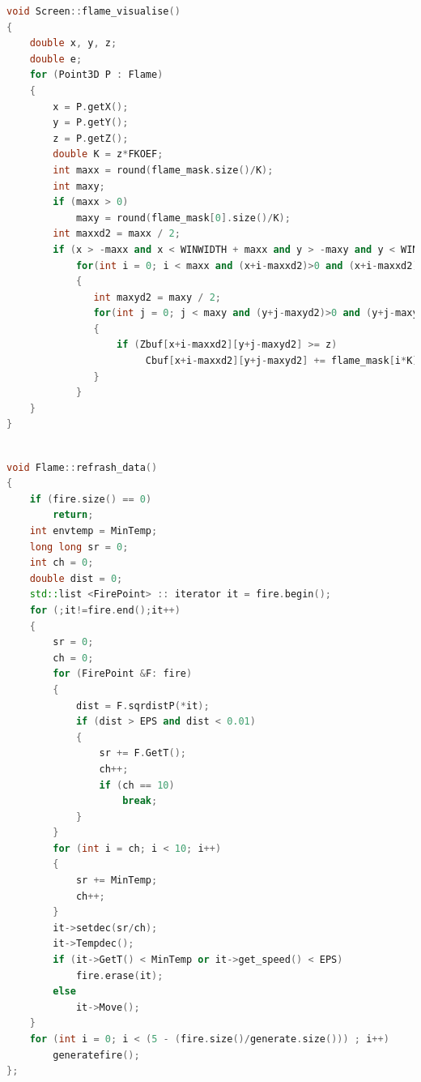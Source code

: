\documentclass[a4paper,14pt]{report}
\begin{document}
\newpage
\begin{center}
\captionsetup{justification=raggedright,singlelinecheck=off}
\begin{lstlisting}[language=C++,
                   directivestyle={\color{black}}
                   emph={int,char,double,float,unsigned},
                   emphstyle={\color{blue}},label=brute,caption = Функция визуализации огня]
void Screen::flame_visualise()
{
    double x, y, z;
    double e;
    for (Point3D P : Flame)
    {
        x = P.getX();
        y = P.getY();
        z = P.getZ();
        double K = z*FKOEF;
        int maxx = round(flame_mask.size()/K);
        int maxy;
        if (maxx > 0)
            maxy = round(flame_mask[0].size()/K);
        int maxxd2 = maxx / 2;
        if (x > -maxx and x < WINWIDTH + maxx and y > -maxy and y < WINHEIGHT + maxy and abs(z) > 0.5)
            for(int i = 0; i < maxx and (x+i-maxxd2)>0 and (x+i-maxxd2)<WINWIDTH; i++)
            {
               int maxyd2 = maxy / 2;
               for(int j = 0; j < maxy and (y+j-maxyd2)>0 and (y+j-maxyd2)<WINWIDTH; j++)
               {
                   if (Zbuf[x+i-maxxd2][y+j-maxyd2] >= z)
                        Cbuf[x+i-maxxd2][y+j-maxyd2] += flame_mask[i*K][j*K];
               }
            }
    }
}
\end{lstlisting}
\end{center}
\newpage
\begin{center}
\captionsetup{justification=raggedright,singlelinecheck=off}
\begin{lstlisting}[language=C++,
                   directivestyle={\color{black}}
                   emph={int,char,double,float,unsigned},
                   emphstyle={\color{blue}},label=brute,caption = Функция обновления данных частиц огня]

void Flame::refrash_data()
{
    if (fire.size() == 0)
        return;
    int envtemp = MinTemp;
    long long sr = 0;
    int ch = 0;
    double dist = 0;
    std::list <FirePoint> :: iterator it = fire.begin();
    for (;it!=fire.end();it++)
    {
        sr = 0;
        ch = 0;
        for (FirePoint &F: fire)
        {
            dist = F.sqrdistP(*it);
            if (dist > EPS and dist < 0.01)
            {
                sr += F.GetT();
                ch++;
                if (ch == 10)
                    break;
            }
        }
        for (int i = ch; i < 10; i++)
        {
            sr += MinTemp;
            ch++;
        }
        it->setdec(sr/ch);
        it->Tempdec();
        if (it->GetT() < MinTemp or it->get_speed() < EPS)
            fire.erase(it);
        else
            it->Move();
    }
    for (int i = 0; i < (5 - (fire.size()/generate.size())) ; i++)
        generatefire();
};
\end{lstlisting}
\end{center}
\end{document}
